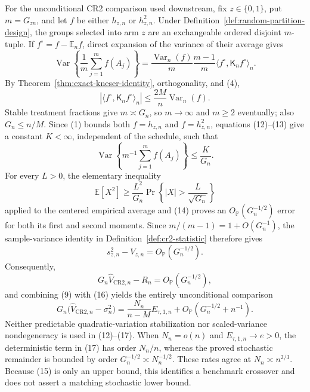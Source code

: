 For the unconditional CR2 comparison used downstream, fix \(z\in\{0,1\}\), put \(m=G_{zn}\), and let \(f\) be either \(h_{z,n}\) or \(h_{z,n}^2\).  Under Definition~\ref{def:random-partition-design}, the groups selected into arm \(z\) are an exchangeable ordered disjoint \(m\)-tuple.  If \(f^\circ=f-\mathbb E_nf\), direct expansion of the variance of their average gives
\[
\operatorname{Var}\!\left\{\frac1m\sum_{j=1}^m f(A_j)\right\}
=\frac{\operatorname{Var}_n(f)}m
\frac{m-1}{m}\langle f^\circ,\mathsf K_nf^\circ\rangle_n. \tag{12}
\]
By Theorem~\ref{thm:exact-kneser-identity}, orthogonality, and (4),
\[
\left|\langle f^\circ,\mathsf K_nf^\circ\rangle_n\right|
\leq\frac{2M}{n}\operatorname{Var}_n(f).                  \tag{13}
\]
Stable treatment fractions give \(m\asymp G_n\), so \(m\to\infty\) and \(m\geq2\) eventually; also \(G_n\leq n/M\).  Since (1) bounds both \(f=h_{z,n}\) and \(f=h_{z,n}^2\), equations (12)--(13) give a constant \(K<\infty\), independent of the schedule, such that
\[
\operatorname{Var}\!\left\{m^{-1}\sum_{j=1}^m f(A_j)\right\}
\leq\frac{K}{G_n}.                                         \tag{14}
\]
For every \(L>0\), the elementary inequality
\[
\mathbb E[X^2]\geq \frac{L^2}{G_n}
 \Pr\!\left\{|X|>\frac{L}{\sqrt{G_n}}\right\}
\]
applied to the centered empirical average and (14) proves an \(O_{\mathbb P}(G_n^{-1/2})\) error for both its first and second moments.  Since \(m/(m-1)=1+O(G_n^{-1})\), the sample-variance identity in Definition~\ref{def:cr2-statistic} therefore gives
\[
s_{z,n}^2-V_{z,n}=O_{\mathbb P}(G_n^{-1/2}).                \tag{15}
\]
Consequently,
\[
G_n\widehat V_{\mathrm{CR2},n}-R_n
=O_{\mathbb P}(G_n^{-1/2}),                                \tag{16}
\]
and combining (9) with (16) yields the entirely unconditional comparison
\[
G_n\bigl(\widehat V_{\mathrm{CR2},n}-\sigma_n^2\bigr)
=\frac{N_n}{n-M}E_{\tau,1,n}
 +O_{\mathbb P}(G_n^{-1/2}+n^{-1}).                        \tag{17}
\]
Neither predictable quadratic-variation stabilization nor scaled-variance nondegeneracy is used in (12)--(17).  When \(N_n=o(n)\) and \(E_{\tau,1,n}\to e>0\), the deterministic term in (17) has order \(N_n/n\), whereas the proved stochastic remainder is bounded by order \(G_n^{-1/2}\asymp N_n^{-1/2}\).  These rates agree at \(N_n\asymp n^{2/3}\).  Because (15) is only an upper bound, this identifies a benchmark crossover and does not assert a matching stochastic lower bound.
